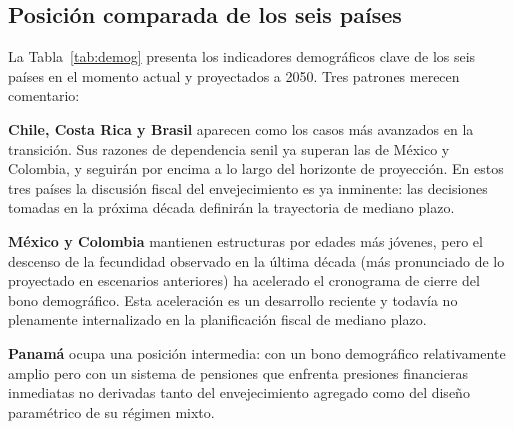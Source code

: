 \documentclass[12pt, letterpaper]{article}
\begin{document}
\subsection{Posición comparada de los seis países}

La Tabla~\ref{tab:demog} presenta los indicadores demográficos clave de los seis
países en el momento actual y proyectados a 2050. Tres patrones merecen comentario:

\textbf{Chile, Costa Rica y Brasil} aparecen como los casos más avanzados en la
transición. Sus razones de dependencia senil ya superan las de México y Colombia, y
seguirán por encima a lo largo del horizonte de proyección. En estos tres países la
discusión fiscal del envejecimiento es ya inminente: las decisiones tomadas en la
próxima década definirán la trayectoria de mediano plazo.

\textbf{México y Colombia} mantienen estructuras por edades más jóvenes, pero el
descenso de la fecundidad observado en la última década (más pronunciado de lo
proyectado en escenarios anteriores) ha acelerado el cronograma de cierre del bono
demográfico. Esta aceleración es un desarrollo reciente y todavía no plenamente
internalizado en la planificación fiscal de mediano plazo.

\textbf{Panamá} ocupa una posición intermedia: con un bono demográfico relativamente
amplio pero con un sistema de pensiones que enfrenta presiones financieras
inmediatas no derivadas tanto del envejecimiento agregado como del diseño
paramétrico de su régimen mixto.
\end{document}
